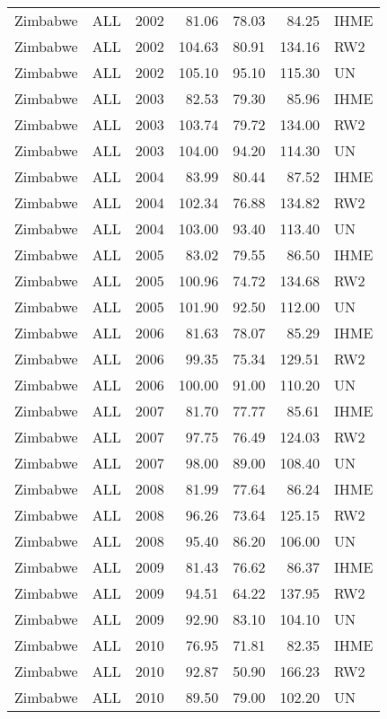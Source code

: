 \begin{longtable}{lllrrrl}
  Zimbabwe & ALL & 2002 & 81.06 & 78.03 & 84.25 & IHME \\ 
  Zimbabwe & ALL & 2002 & 104.63 & 80.91 & 134.16 & RW2 \\ 
  Zimbabwe & ALL & 2002 & 105.10 & 95.10 & 115.30 & UN \\ 
  Zimbabwe & ALL & 2003 & 82.53 & 79.30 & 85.96 & IHME \\ 
  Zimbabwe & ALL & 2003 & 103.74 & 79.72 & 134.00 & RW2 \\ 
  Zimbabwe & ALL & 2003 & 104.00 & 94.20 & 114.30 & UN \\ 
  Zimbabwe & ALL & 2004 & 83.99 & 80.44 & 87.52 & IHME \\ 
  Zimbabwe & ALL & 2004 & 102.34 & 76.88 & 134.82 & RW2 \\ 
  Zimbabwe & ALL & 2004 & 103.00 & 93.40 & 113.40 & UN \\ 
  Zimbabwe & ALL & 2005 & 83.02 & 79.55 & 86.50 & IHME \\ 
  Zimbabwe & ALL & 2005 & 100.96 & 74.72 & 134.68 & RW2 \\ 
  Zimbabwe & ALL & 2005 & 101.90 & 92.50 & 112.00 & UN \\ 
  Zimbabwe & ALL & 2006 & 81.63 & 78.07 & 85.29 & IHME \\ 
  Zimbabwe & ALL & 2006 & 99.35 & 75.34 & 129.51 & RW2 \\ 
  Zimbabwe & ALL & 2006 & 100.00 & 91.00 & 110.20 & UN \\ 
  Zimbabwe & ALL & 2007 & 81.70 & 77.77 & 85.61 & IHME \\ 
  Zimbabwe & ALL & 2007 & 97.75 & 76.49 & 124.03 & RW2 \\ 
  Zimbabwe & ALL & 2007 & 98.00 & 89.00 & 108.40 & UN \\ 
  Zimbabwe & ALL & 2008 & 81.99 & 77.64 & 86.24 & IHME \\ 
  Zimbabwe & ALL & 2008 & 96.26 & 73.64 & 125.15 & RW2 \\ 
  Zimbabwe & ALL & 2008 & 95.40 & 86.20 & 106.00 & UN \\ 
  Zimbabwe & ALL & 2009 & 81.43 & 76.62 & 86.37 & IHME \\ 
  Zimbabwe & ALL & 2009 & 94.51 & 64.22 & 137.95 & RW2 \\ 
  Zimbabwe & ALL & 2009 & 92.90 & 83.10 & 104.10 & UN \\ 
  Zimbabwe & ALL & 2010 & 76.95 & 71.81 & 82.35 & IHME \\ 
  Zimbabwe & ALL & 2010 & 92.87 & 50.90 & 166.23 & RW2 \\ 
  Zimbabwe & ALL & 2010 & 89.50 & 79.00 & 102.20 & UN \\ 

\end{longtable}
